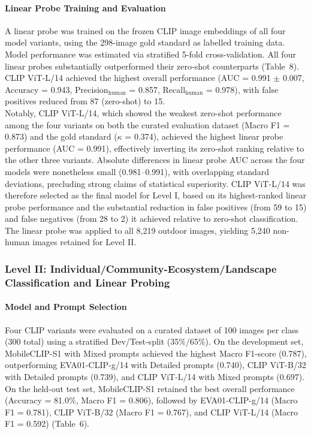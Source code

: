 \documentclass[hidelinks, 11pt]{article}
\begin{document}
\paragraph{Linear Probe Training and Evaluation}

A linear probe was trained on the frozen CLIP image embeddings of all four model variants, using the 298-image gold standard as labelled training data. Model performance was estimated via stratified 5-fold cross-validation. All four linear probes substantially outperformed their zero-shot counterparts (Table~8). CLIP ViT-L/14 achieved the highest overall performance (AUC = 0.991 $\pm$ 0.007, Accuracy = 0.943, Precision$_{\mathrm{human}}$ = 0.857, Recall$_{\mathrm{human}}$ = 0.978), with false positives reduced from 87 (zero-shot) to 15.
\\
Notably, CLIP ViT-L/14, which showed the weakest zero-shot performance among the four variants on both the curated evaluation dataset (Macro F1 = 0.873) and the gold standard ($\kappa$ = 0.374), achieved the highest
linear probe performance (AUC = 0.991), effectively inverting its zero-shot ranking relative to the other three variants. Absolute differences in linear probe AUC across the four models were nonetheless small (0.981--0.991), with overlapping standard deviations, precluding strong claims of statistical superiority. CLIP ViT-L/14 was therefore selected as the final model for Level I, based on its highest-ranked linear probe performance and the substantial reduction in false positives (from 59 to 15) and false negatives (from 28 to 2) it achieved relative to zero-shot classification. The linear probe was applied to all 8,219 outdoor images, yielding 5,240 non-human images retained for Level II.

\subsubsection{Level II: Individual/Community-Ecosystem/Landscape Classification and Linear Probing}

\paragraph{Model and Prompt Selection}
Four CLIP variants were evaluated on a curated dataset of 100 images per class (300 total) using a stratified Dev/Test-split (35\%/65\%). On the development set, MobileCLIP-S1 with Mixed prompts achieved the highest Macro F1-score (0.787), outperforming EVA01-CLIP-g/14 with Detailed prompts (0.740), CLIP ViT-B/32 with Detailed prompts (0.739), and CLIP ViT-L/14 with Mixed prompts (0.697). On the held-out test set, MobileCLIP-S1 retained the best overall performance (Accuracy = 81.0\%, Macro F1 = 0.806), followed by EVA01-CLIP-g/14 (Macro F1 = 0.781), CLIP ViT-B/32 (Macro F1 = 0.767), and CLIP ViT-L/14 (Macro F1 = 0.592) (Table~6).
\end{document}
